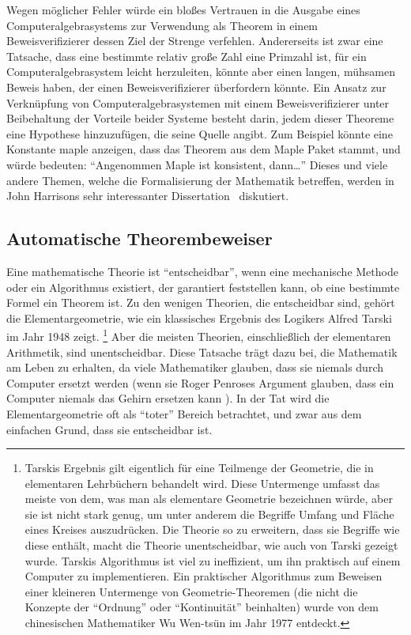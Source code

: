 Wegen möglicher Fehler würde ein bloßes Vertrauen in die Ausgabe eines Computeralgebrasystems zur Verwendung als Theorem in einem Beweisverifizierer dessen Ziel der Strenge verfehlen.
Andererseits ist zwar eine Tatsache, dass eine bestimmte relativ große Zahl eine Primzahl ist, für ein Computeralgebrasystem leicht herzuleiten, könnte aber einen langen, mühsamen Beweis haben, der einen Beweisverifizierer überfordern könnte. Ein Ansatz zur Verknüpfung von
Computeralgebrasystemen mit einem Beweisverifizierer unter Beibehaltung der Vorteile beider Systeme besteht darin, jedem dieser Theoreme eine Hypothese hinzuzufügen, die seine Quelle angibt.
Zum Beispiel könnte eine Konstante {\sc maple} anzeigen, dass das Theorem aus dem Maple
Paket stammt, und würde bedeuten: "`Angenommen Maple ist konsistent, dann\ldots"' Dieses und
viele andere Themen, welche die Formalisierung der Mathematik betreffen, werden in John Harrisons sehr interessanter Dissertation~\cite{Harrison-thesis} diskutiert.

\subsection{Automatische Theorembeweiser}\label{theoremprovers} 

Eine mathematische Theorie ist "`entscheidbar"', wenn eine mechanische Methode oder ein Algorithmus existiert, der garantiert feststellen kann, ob eine bestimmte Formel ein Theorem ist.  Zu den wenigen Theorien, die entscheidbar sind, gehört die Elementargeometrie, wie ein klassisches Ergebnis des Logikers Alfred Tarski im Jahr 1948
\cite{Tarski} zeigt.
\footnote{Tarskis Ergebnis gilt eigentlich für eine Teilmenge der Geometrie, die in elementaren Lehrbüchern behandelt wird.  Diese Untermenge umfasst das meiste von dem, was man als elementare Geometrie bezeichnen würde, aber sie ist nicht stark genug, um unter anderem die Begriffe Umfang und Fläche eines Kreises auszudrücken.  Die Theorie so zu erweitern, dass sie Begriffe wie diese enthält, macht die Theorie unentscheidbar, wie auch von Tarski gezeigt wurde.  Tarskis Algorithmus ist viel zu ineffizient, um ihn praktisch auf einem Computer zu implementieren.  Ein praktischer Algorithmus zum Beweisen einer kleineren Untermenge von Geometrie-Theoremen (die nicht die Konzepte der "`Ordnung"' oder "`Kontinuität"' beinhalten) wurde von dem chinesischen Mathematiker Wu Wen-ts\"{u}n im Jahr 1977 \cite{Chou} entdeckt.} 
Aber die meisten Theorien, einschließlich der elementaren Arithmetik, sind unentscheidbar.  Diese Tatsache trägt dazu bei, die Mathematik am Leben zu erhalten, da viele Mathematiker glauben, dass sie niemals
durch Computer ersetzt werden (wenn sie Roger Penroses Argument glauben, dass ein Computer niemals das Gehirn ersetzen kann \cite{Penrose}).
In der Tat wird die Elementargeometrie oft als "`toter"' Bereich betrachtet, und zwar aus dem einfachen Grund, dass sie entscheidbar ist.

